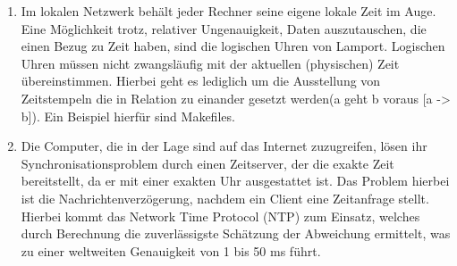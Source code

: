 \documentclass[a4paper]{scrartcl}
\begin{document}
	\renewcommand{\labelenumi}{\alph{enumi})}
	\begin{enumerate}
		\item Im lokalen Netzwerk behält jeder Rechner seine eigene lokale Zeit im Auge. Eine Möglichkeit trotz, relativer Ungenauigkeit, Daten auszutauschen, die einen Bezug zu Zeit haben, sind die logischen Uhren von Lamport. Logischen Uhren müssen nicht zwangsläufig mit der aktuellen (physischen) Zeit übereinstimmen. Hierbei geht es lediglich um die Ausstellung von Zeitstempeln die in Relation zu einander gesetzt werden(a geht b voraus [a -> b]). Ein Beispiel hierfür sind Makefiles. 
		
		\item Die Computer, die in der Lage sind auf das Internet zuzugreifen, lösen ihr Synchronisationsproblem durch einen Zeitserver, der die exakte Zeit bereitstellt, da er mit einer exakten Uhr ausgestattet ist. Das Problem hierbei ist die Nachrichtenverzögerung, nachdem ein Client eine Zeitanfrage stellt. Hierbei kommt das Network Time Protocol (NTP) zum Einsatz, welches durch Berechnung die zuverlässigste Schätzung der Abweichung ermittelt, was zu einer weltweiten Genauigkeit von 1 bis 50 ms führt.
	\end{enumerate}
	
\end{document}
